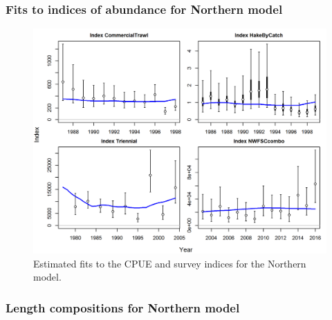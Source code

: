 \documentclass[12pt,]{article}
\begin{document}
\FloatBarrier

\subsubsection{Fits to indices of abundance for Northern
model}\label{fits-to-indices-of-abundance-for-northern-model}

\begin{figure}[htbp]
\centering
\includegraphics{r4ss/plots_mod1/index0_all_indices_fit.png}
\caption{Estimated fits to the CPUE and survey indices for the Northern
model. \label{fig:index_fits1}}
\end{figure}

\FloatBarrier

\newpage

\subsubsection{Length compositions for Northern
model}\label{length-compositions-for-northern-model}
\end{document}
